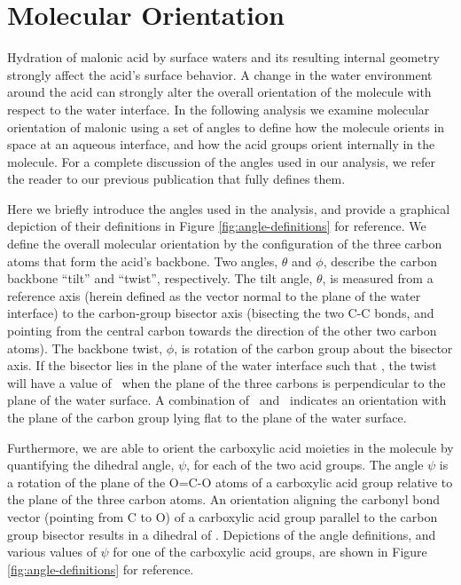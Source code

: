 \section {Molecular Orientation}

Hydration of malonic acid by surface waters and its resulting internal geometry strongly affect the acid's surface behavior. A change in the water environment around the acid can strongly alter the overall orientation of the molecule with respect to the water interface. In the following analysis we examine molecular orientation of malonic using a set of angles to define how the molecule orients in space at an aqueous interface, and how the acid groups orient internally in the molecule. For a complete discussion of the angles used in our analysis, we refer the reader to our previous publication that fully defines them.\cite{Blower2012}

Here we briefly introduce the angles used in the analysis, and provide a graphical depiction of their definitions in Figure \ref{fig:angle-definitions} for reference. We define the overall molecular orientation by the configuration of the three carbon atoms that form the acid's backbone. Two angles, $\theta$ and $\phi$, describe the carbon backbone ``tilt'' and ``twist'', respectively. The tilt angle, $\theta$, is measured from a reference axis (herein defined as the vector normal to the plane of the water interface) to the carbon-group bisector axis (bisecting the two C-C bonds, and pointing from the central carbon towards the direction of the other two carbon atoms). The backbone twist, $\phi$, is rotation of the carbon group about the bisector axis. If the bisector lies in the plane of the water interface such that \degr, the twist will have a value of \degr~when the plane of the three carbons is perpendicular to the plane of the water surface. A combination of \degr~and \degr~indicates an orientation with the plane of the carbon group lying flat to the plane of the water surface.

Furthermore, we are able to orient the carboxylic acid moieties in the molecule by quantifying the dihedral angle, $\psi$, for each of the two acid groups. The angle $\psi$ is a rotation of the plane of the O=C-O atoms of a carboxylic acid group relative to the plane of the three carbon atoms. An orientation aligning the carbonyl bond vector (pointing from C to O) of a carboxylic acid group parallel to the carbon group bisector results in a dihedral of \degr. Depictions of the angle definitions, and various values of $\psi$ for one of the carboxylic acid groups, are shown in Figure \ref{fig:angle-definitions} for reference.

